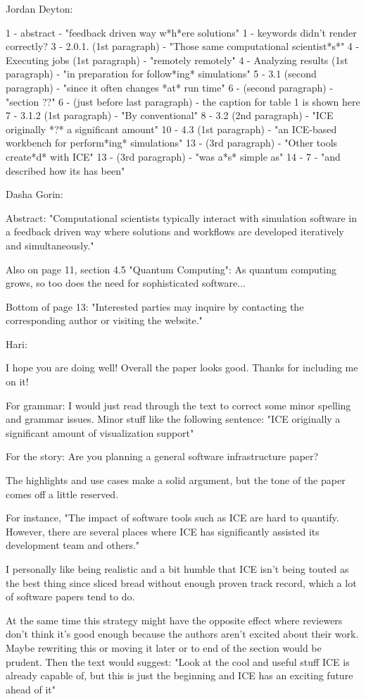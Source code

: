 Jordan Deyton:

1 - abstract - "feedback driven way w*h*ere solutions"
1 - keywords didn't render correctly?
3 - 2.0.1. (1st paragraph) - "Those same computational scientist*s*"
4 - Executing jobs (1st paragraph) - "remotely remotely"
4 - Analyzing results (1st paragraph) - "in preparation for follow*ing* simulations"
5 - 3.1 (second paragraph) - "since it often changes *at* run time"
6 - (second paragraph) - "section ??"
6 - (just before last paragraph) - the caption for table 1 is shown here
7 - 3.1.2 (1st paragraph) - "By conventional"
8 - 3.2 (2nd paragraph) - "ICE originally *?* a significant amount"
10 - 4.3 (1st paragraph) - "an ICE-based workbench for perform*ing* simulations"
13 - (3rd paragraph) - "Other tools create*d* with ICE"
13 - (3rd paragraph) - "was a*s* simple as"
14 - 7 - "and described how its has been"

Dasha Gorin:

Abstract:
"Computational scientists typically interact with simulation software in a feedback driven way where solutions and workflows are developed iteratively and simultaneously." 

Also on page 11, section 4.5 "Quantum Computing":
As quantum computing grows, so too does the need for sophisticated software...

Bottom of page 13:
"Interested parties may inquire by contacting the corresponding author or visiting the website."

Hari:

I hope you are doing well! Overall the paper looks good. Thanks for including me on it!

For grammar: I would just read through the text to correct some minor spelling and grammar issues. Minor stuff like the following sentence: "ICE originally a significant amount of visualization support"

For the story: Are you planning a general software infrastructure paper? 

The highlights and use cases make a solid argument, but the tone of the paper comes off a little reserved.

For instance,  "The impact of software tools such as ICE are hard to quantify. However, there are several places where ICE has significantly assisted its development team and others."

I personally like being realistic and a bit humble that ICE isn't being touted as the best thing since sliced bread without enough proven track record, which a lot of software papers tend to do. 

At the same time this strategy might have the opposite effect where reviewers don't think it's good enough because the authors aren't excited about their work. Maybe rewriting this or moving it later or to end of the section would be prudent. Then the text would suggest: "Look at the cool and useful stuff ICE is already capable of, but this is just the beginning and ICE has an exciting future ahead of it"